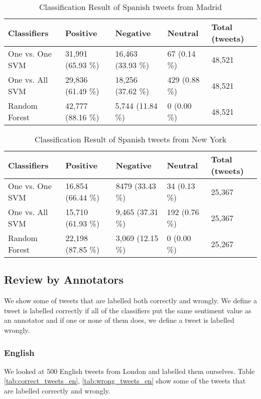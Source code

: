 \begin{table}[ht]
	\caption{Classification Result of Spanish tweets from Madrid}
	\begin{tabular}{|l|p{1.8cm}|p{1.8cm}|p{1.8cm}|p{1.8cm}|} \hline
	Classifiers & Positive & Negative & Neutral & Total (tweets)\\ \hline
One vs. One SVM & 31,991 (65.93 \%) & 16,463 (33.93 \%)& 67 (0.14 \%)& 48,521 \\ \hline
One vs. All SVM & 29,836 (61.49 \%)& 18,256 (37.62 \%)& 429 (0.88 \%)& 48,521 \\ \hline
Random Forest   & 42,777 (88.16 \%)& 5,744 (11.84 \%) & 0 (0.00 \%)  & 48,521 \\ \hline
	\end{tabular}
	\label{tab:result_madrid_es}
\end{table}

\begin{table}[ht]
	\caption{Classification Result of Spanish tweets from New York}
	\begin{tabular}{|l|p{1.8cm}|p{1.8cm}|p{1.8cm}|p{1.8cm}|} \hline
	Classifiers & Positive & Negative & Neutral & Total (tweets)\\ \hline
One vs. One SVM & 16,854 (66.44 \%)& 8479 (33.43 \%)& 34 (0.13 \%) & 25,367 \\ \hline
One vs. All SVM & 15,710 (61.93 \%)& 9,465 (37.31 \%)& 192 (0.76 \%)& 25,367 \\ \hline
Random Forest   & 22,198 (87.85 \%)& 3,069 (12.15 \%)& 0 (0.00 \%)  & 25,267 \\ \hline
	\end{tabular}
	\label{tab:result_ny_es}
\end{table}


\begin{comment}
London
N.Y or San Francisco

\end{comment}

\subsection{Review by Annotators}
We show some of tweets that are labelled both correctly and wrongly.
We define a tweet is labelled correctly if all of the classifiers put the same sentiment value as an annotator and if one or none of them does, we define a tweet is labelled wrongly.
\subsubsection{English}
We looked at 500 English tweets from London and labelled them ourselves.
Table \ref{tab:correct_tweets_en}, \ref{tab:wrong_tweets_en} show some of the tweets that are labelled correctly and wrongly.

